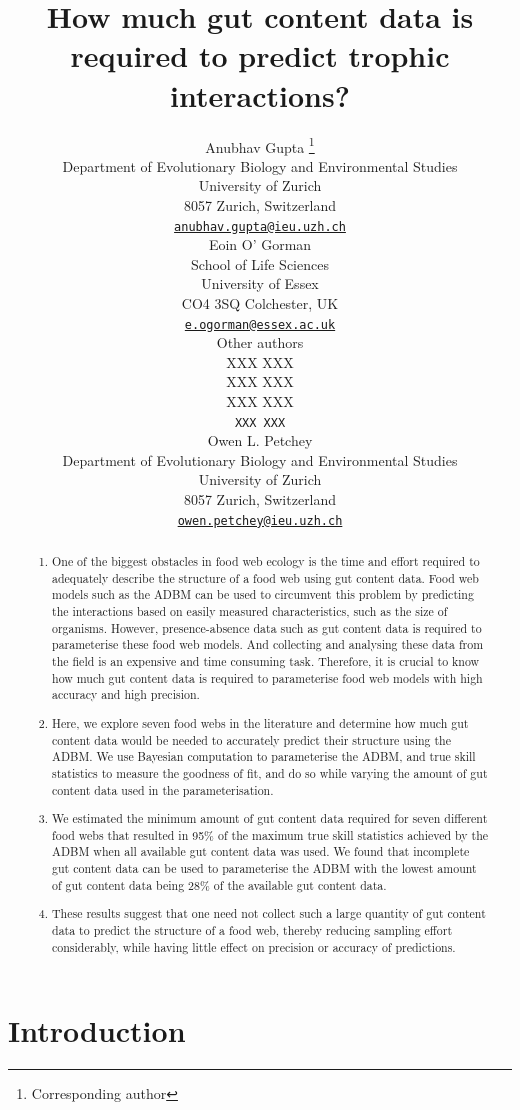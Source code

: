 \documentclass{article}
\title{How much gut content data is required to predict trophic
interactions?}
\author{
    Anubhav Gupta
    \thanks{Corresponding author}
   \\
    Department of Evolutionary Biology and Environmental Studies \\
    University of Zurich \\
  8057 Zurich, Switzerland \\
  \texttt{\href{mailto:anubhav.gupta@ieu.uzh.ch}{\nolinkurl{anubhav.gupta@ieu.uzh.ch}}} \\
   \And
    Eoin O' Gorman
   \\
    School of Life Sciences \\
    University of Essex \\
  CO4 3SQ Colchester, UK \\
  \texttt{\href{mailto:e.ogorman@essex.ac.uk}{\nolinkurl{e.ogorman@essex.ac.uk}}} \\
   \And
    Other authors
   \\
    XXX XXX \\
    XXX XXX \\
  XXX XXX \\
  \texttt{XXX XXX} \\
   \And
    Owen L. Petchey
   \\
    Department of Evolutionary Biology and Environmental Studies \\
    University of Zurich \\
  8057 Zurich, Switzerland \\
  \texttt{\href{mailto:owen.petchey@ieu.uzh.ch}{\nolinkurl{owen.petchey@ieu.uzh.ch}}} \\
  }
\providecommand{\tightlist}{%
  \setlength{\itemsep}{0pt}\setlength{\parskip}{0pt}}
\begin{document}
\maketitle


\begin{abstract}
\begin{enumerate}
\def\labelenumi{\arabic{enumi})}
\tightlist
\item
  One of the biggest obstacles in food web ecology is the time and
  effort required to adequately describe the structure of a food web
  using gut content data. Food web models such as the ADBM can be used
  to circumvent this problem by predicting the interactions based on
  easily measured characteristics, such as the size of organisms.
  However, presence-absence data such as gut content data is required to
  parameterise these food web models. And collecting and analysing these
  data from the field is an expensive and time consuming task.
  Therefore, it is crucial to know how much gut content data is required
  to parameterise food web models with high accuracy and high precision.
\item
  Here, we explore seven food webs in the literature and determine how
  much gut content data would be needed to accurately predict their
  structure using the ADBM. We use Bayesian computation to parameterise
  the ADBM, and true skill statistics to measure the goodness of fit,
  and do so while varying the amount of gut content data used in the
  parameterisation.
\item
  We estimated the minimum amount of gut content data required for seven
  different food webs that resulted in 95\% of the maximum true skill
  statistics achieved by the ADBM when all available gut content data
  was used. We found that incomplete gut content data can be used to
  parameterise the ADBM with the lowest amount of gut content data being
  28\% of the available gut content data.
\item
  These results suggest that one need not collect such a large quantity
  of gut content data to predict the structure of a food web, thereby
  reducing sampling effort considerably, while having little effect on
  precision or accuracy of predictions.
\end{enumerate}
\end{abstract}


\hypertarget{introduction}{%
\section{Introduction}\label{introduction}}
\end{document}
